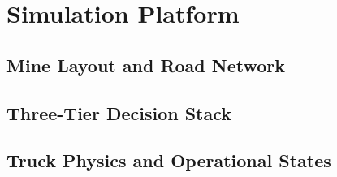 \section{Simulation Platform}

\subsection{Mine Layout and Road Network}

\subsection{Three-Tier Decision Stack}

\subsection{Truck Physics and Operational States}

